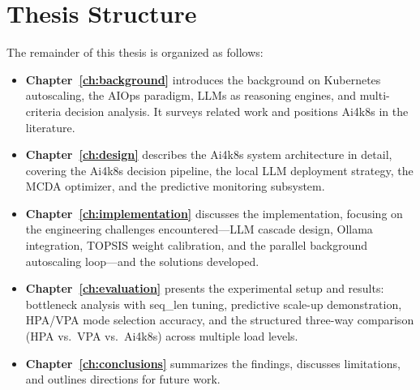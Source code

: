 \section{Thesis Structure}
\label{sec:structure}

The remainder of this thesis is organized as follows:

\begin{itemize}
  \item \textbf{Chapter~\ref{ch:background}} introduces the background on Kubernetes
  autoscaling, the AIOps paradigm, LLMs as reasoning engines, and multi-criteria
  decision analysis. It surveys related work and positions Ai4k8s in the literature.

  \item \textbf{Chapter~\ref{ch:design}} describes the Ai4k8s system architecture
  in detail, covering the Ai4k8s decision pipeline, the local LLM deployment
  strategy, the MCDA optimizer, and the predictive monitoring subsystem.

  \item \textbf{Chapter~\ref{ch:implementation}} discusses the implementation,
  focusing on the engineering challenges encountered—LLM cascade design, Ollama
  integration, TOPSIS weight calibration, and the parallel background autoscaling
  loop—and the solutions developed.

  \item \textbf{Chapter~\ref{ch:evaluation}} presents the experimental setup and
  results: bottleneck analysis with seq\_len tuning, predictive scale-up
  demonstration, HPA/VPA mode selection accuracy, and the structured three-way
  comparison (HPA vs.\ VPA vs.\ Ai4k8s) across multiple load levels.

  \item \textbf{Chapter~\ref{ch:conclusions}} summarizes the findings, discusses
  limitations, and outlines directions for future work.
\end{itemize}
